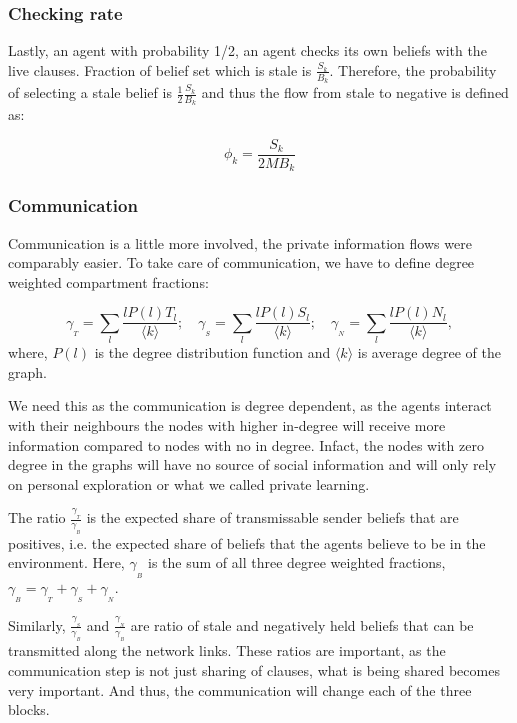 \documentclass[]{article}
\begin{document}
\subsubsection{Checking rate}

Lastly, an agent with probability 1/2, an agent checks its own beliefs with the live clauses. 
Fraction of belief set which is stale is $\frac{S_k}{B_k}$. Therefore, the probability of selecting a stale belief is $\frac{1}{2}\frac{S_k}{B_k}$ and thus the flow from stale to negative is defined as:

\begin{equation}
	{\phi_k}=\frac{S_k}{2MB_k}
\end{equation}

\subsubsection{Communication}

Communication is a little more involved, the private information flows were comparably easier. To take care of communication, we have to define degree weighted compartment fractions:

\begin{equation}
	\gamma_{\!_T}=\sum_l \frac{ l P(l) T_l}{\langle k \rangle};\quad \gamma_{\!_S}=\sum_l \frac{ l P(l) S_l}{\langle k \rangle};\quad\gamma_{\!_N}=\sum_l \frac{ l P(l) N_l}{\langle k \rangle},
\end{equation}
where, $P(l)$ is the degree distribution function and $\langle k \rangle$ is average degree of the graph.

We need this as the communication is degree dependent, as the agents interact with their neighbours the nodes with higher in-degree will receive more information compared to nodes with no in degree. Infact, the nodes with zero degree in the graphs will have no source of social information and will only rely on personal exploration or what we called private learning.

The ratio $\frac{\gamma_{\!_T}}{\gamma_{\!_B}}$ is the expected share of transmissable sender beliefs that are positives, i.e. the expected share of beliefs that the agents believe to be in the environment. Here, $\gamma_{\!_B}$ is the sum of all three degree weighted fractions, $\gamma_{\!_B}=\gamma_{\!_T}+\gamma_{\!_S}+\gamma_{\!_N}$.


Similarly, $\frac{\gamma_{\!_S}}{\gamma_{\!_B}}$ and $\frac{\gamma_{\!_N}}{\gamma_{\!_B}}$ are ratio of stale and negatively held beliefs that can be transmitted along the network links. These ratios are important, as the communication step is not just sharing of clauses, what is being shared becomes very important. And thus, the communication will change each of the three blocks.
\end{document}
